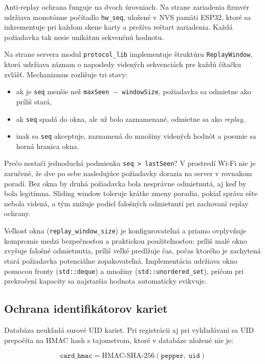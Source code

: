 \documentclass[journal,a4paper,onecolumn]{IEEEtran}
\begin{document}
Anti-replay ochrana funguje na dvoch úrovniach. Na strane zariadenia firmvér udržiava monotónne počítadlo \texttt{hw\_seq}, uložené v NVS pamäti ESP32, ktoré sa inkrementuje pri každom skene karty a prežíva reštart zariadenia. Každá požiadavka tak nesie unikátnu sekvenčnú hodnotu.

Na strane servera modul \texttt{protocol\_lib} implementuje štruktúru \texttt{ReplayWindow}, ktorá udržiava záznam o naposledy videných sekvenciách pre každú čítačku zvlášť. Mechanizmus rozlišuje tri stavy:

\begin{itemize}[leftmargin=*,itemsep=2pt]
  \item ak je \texttt{seq} menšie než \texttt{maxSeen $-$ windowSize}, požiadavka sa odmietne ako príliš stará,
  \item ak \texttt{seq} spadá do okna, ale už bolo zaznamenané, odmietne sa ako \emph{replay},
  \item inak sa \texttt{seq} akceptuje, zaznamená do množiny videných hodnôt a posunie sa horná hranica okna.
\end{itemize}

Prečo nestačí jednoduchá podmienka \texttt{seq > lastSeen}? V prostredí Wi-Fi nie je zaručené, že dve po sebe nasledujúce požiadavky dorazia na server v rovnakom poradí. Bez okna by druhá požiadavka bola nesprávne odmietnutá, aj keď by bola legitímna. Sliding window toleruje krátke zmeny poradia, pokiaľ správa ešte nebola videná, a tým znižuje podiel falošných odmietnutí pri zachovaní replay ochrany.

Veľkosť okna (\texttt{replay\_window\_size}) je konfigurovateľná a priamo ovplyvňuje kompromis medzi bezpečnosťou a praktickou použiteľnosťou: príliš malé okno zvyšuje falošné odmietnutia, príliš veľké predlžuje čas, počas ktorého je zachytená stará požiadavka potenciálne zopakovateľná. Implementácia udržiava okno pomocou fronty (\texttt{std::deque}) a množiny (\texttt{std::unordered\_set}), pričom pri prekročení kapacity sa najstaršia hodnota automaticky evikvuje.

\subsection{Ochrana identifikátorov kariet}

Databáza neukladá surové UID kariet. Pri registrácii aj pri vyhľadávaní sa UID prepočíta na HMAC hash s tajomstvom, ktoré v databáze uložené nie je:

\begin{equation}
\texttt{card\_hmac} = \mathrm{HMAC\text{-}SHA\text{-}256}(\texttt{pepper},\; \texttt{uid})
\end{equation}
\end{document}
